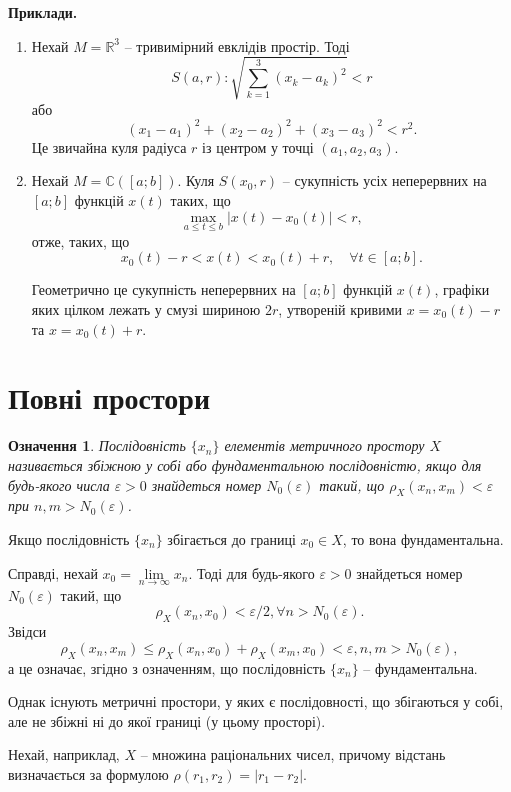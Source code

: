 \documentclass[14pt,twoside]{extreport}
\theoremstyle{mystyle}
\newtheorem{dfn}{Означення}
\numberwithin{equation}{chapter}
\newcommand{\cab}{\mathbb{C}([a; b])}
\begin{document}
\textbf{Приклади.}
 \begin{enumerate}
  \item Нехай $M = \mathbb{R}^3$ -- тривимірний евклідів простір. Тоді
\[
 S(a, r): \sqrt{\sum\limits_{k=1}^{3}(x_k - a_k)^2} <r
\]
або
\[
 (x_1 - a_1)^2 + (x_2 - a_2)^2 + (x_3 - a_3)^2 <r^2.
\]
Це звичайна куля радіуса $r$ із центром у точці $(a_1, a_2, a_3)$.
  \item Нехай $M = \cab$. Куля $S(x_0, r)$ -- сукупність усіх неперервних на $[a; b]$ функцій $x(t)$ таких, що
\[
 \max\limits_{a\leqslant t \leqslant b} |x(t) - x_0(t)| < r,
\]
 отже, таких, що
\[
 x_0(t) - r < x(t) < x_0(t) +r, \quad \forall t \in [a; b].
\]

Геометрично це сукупність неперервних на $[a; b]$ функцій $x(t)$, графіки яких цілком лежать у смузі шириною $2r$, утвореній кривими $x = x_0(t) - r$ та $x = x_0(t) + r$.
 \end{enumerate}

\section{Повні простори}

\begin{dfn}
 Послідовність $\{x_n\}$ елементів метричного простору $X$ називається збіжною у собі або фундаментальною послідовністю, якщо для будь-якого числа $\varepsilon > 0$ знайдеться номер $N_0(\varepsilon)$ такий, що $\rho_X(x_n, x_m)<\varepsilon$ при $n, m >N_0(\varepsilon)$.
\end{dfn}

Якщо послідовність $\{x_n\}$ збігається до границі $x_0 \in X$, то вона фундаментальна.

Справді, нехай $x_0 = \lim\limits_{n\to\infty} x_n$. Тоді для будь-якого $\varepsilon > 0$ знайдеться номер $N_0(\varepsilon)$ такий, що
\[
 \rho_X(x_n, x_0) < \varepsilon /2,  \forall n>N_0(\varepsilon).
\]
Звідси
\[
 \rho_X(x_n, x_m) \leqslant \rho_X(x_n, x_0) + \rho_X(x_m, x_0) < \varepsilon, n,m> N_0(\varepsilon),
\]
а це означає, згідно з означенням, що послідовність $\{x_n\}$ -- фундаментальна.

Однак існують метричні простори, у яких є послідовності, що збігаються у собі, але не збіжні ні до якої границі (у цьому просторі).

Нехай, наприклад, $X$ -- множина раціональних чисел, причому відстань визначається за формулою $\rho(r_1, r_2) = |r_1 - r_2|$.
\end{document}
